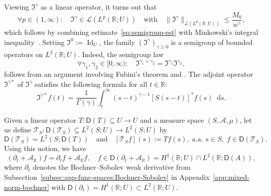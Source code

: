 \documentclass[reqno]{amsart}
\numberwithin{equation}{section}
\newcommand{\bbR}{\mathbb{R}}
\newcommand{\R}{\mathbb{R}}
\newcommand{\cA}{\mathcal{A}}
\newcommand{\cT}{\mathcal{T}}
\newcommand{\norm}[2]{     \| #1       \|_{ #2 }}
\newcommand{\rd}{\mathop{}\!\mathrm{d}}
\newcommand{\from}{\colon}
\newcommand{\id}{\operatorname{Id}}
\newcommand{\dom}[1]{\mathsf D(#1)}
\newcommand{\LO}{\mathscr L}
\theoremstyle{remark}
\theoremstyle{definition}
\begin{document}
Viewing $\mathfrak I^\gamma$ as a linear operator, it turns out that
%
\[
\forall p \in (1,\infty) : \quad 
\mathfrak I^\gamma \in \LO(L^p(\R;U)) 
\quad \text{with} \quad
\norm{\mathfrak I^\gamma}{\mathscr L(L^p(\R;U))}
\le
\frac{M_0}{w^{\gamma }},
\]
%
which follows by combining estimate~\eqref{eq:semigroup-est} with Minkowski's integral inequality~\cite[Section~{A.1}]{Stein1970}. 
Setting $\mathfrak I^0 := \id_U$,
the family $(\mathfrak I^\gamma)_{\gamma\ge0}$ is a semigroup of bounded operators
on $L^2(\R; U)$. Indeed,
the semigroup law
%
\begin{equation}\label{eq:semigroup-law-I}
	\forall \gamma_1, \gamma_2 \in [0,\infty)\colon  \quad 
	\mathfrak I^{\gamma_1 + \gamma_2} = \mathfrak I^{\gamma_1} \mathfrak I^{\gamma_2},
\end{equation}
%
follows from an argument involving Fubini's theorem and \cite[Equation~(5.12.1)]{Olver2010}.
The adjoint operator $\mathfrak I^{\gamma*}$ of $\mathfrak I^{\gamma}$ satisfies
the following formula for all $t \in \bbR$:
%
\begin{equation}\label{eq:Igamma-adjoint}
	\mathfrak I^{\gamma*} f(t) 
	= \frac{1}{\Gamma(\gamma)} \int_t^\infty (s-t)^{\gamma-1} [S(s-t)]^* f(s) \rd s.
\end{equation}
%

Given a linear operator $T \from \mathsf D(T) \subseteq U \to U$
and a measure space $(S, \mathscr A, \mu)$, let us define
$\cT_S \from \mathsf D(\cT_S) \subseteq L^2(S; U) \to L^2(S; U)$ by
%
\begin{equation}\label{eq:Bochner-counterpart}
	\mathsf D(\cT_S) = L^2(S; \mathsf D(T)) \quad \text{and} \quad
	[\cT_S f](s) := Tf(s), \; \text{a.a. } s\in S, \;
	f \in \mathsf D(\cT_S).
\end{equation}
%
Using this notion, we have
%
\begin{equation}
	(\partial_t + \cA_\bbR)f = \partial_t f + \cA_\bbR f, 
	\quad f \in \dom{\partial_t + \cA_\bbR} = H^1(\bbR; U) \cap L^2(\R; \dom{A}),
\end{equation}
%
where
$\partial_t$ denotes the Bochner--Sobolev weak derivative 
from Subsection~\ref{subsec:app-func-spaces:Bochner-Sobolev} in Appendix~\ref{app:mixed-norm-bochner} with 
$\mathsf D(\partial_t) = H^1(\R; U) \subset L^2(\R; U)$.
\end{document}
